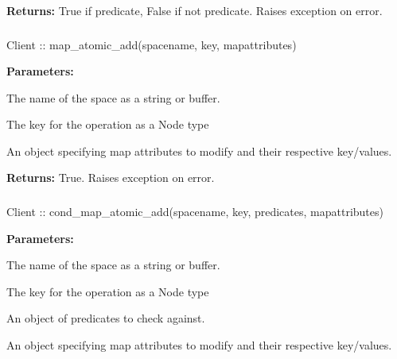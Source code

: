 \noindent\textbf{Returns:}
True if predicate, False if not predicate.  Raises exception on error.

\subsubsection{}
\label{api:nodejs:map_atomic_add}
\begin{javascriptcode}
Client :: map_atomic_add(spacename, key, mapattributes)
\end{javascriptcode}


\noindent\textbf{Parameters:}
\begin{description}[labelindent=\widthof{{\code{mapattributes}}},leftmargin=*,noitemsep,nolistsep,align=right]
\item[\code{spacename}] The name of the space as a string or buffer.
\item[\code{key}] The key for the operation as a Node type
\item[\code{mapattributes}] An object specifying map attributes to modify and their respective key/values.
\end{description}

\noindent\textbf{Returns:}
True.  Raises exception on error.

\subsubsection{}
\label{api:nodejs:cond_map_atomic_add}
\begin{javascriptcode}
Client :: cond_map_atomic_add(spacename, key, predicates, mapattributes)
\end{javascriptcode}


\noindent\textbf{Parameters:}
\begin{description}[labelindent=\widthof{{\code{mapattributes}}},leftmargin=*,noitemsep,nolistsep,align=right]
\item[\code{spacename}] The name of the space as a string or buffer.
\item[\code{key}] The key for the operation as a Node type
\item[\code{predicates}] An object of predicates to check against.
\item[\code{mapattributes}] An object specifying map attributes to modify and their respective key/values.
\end{description}

